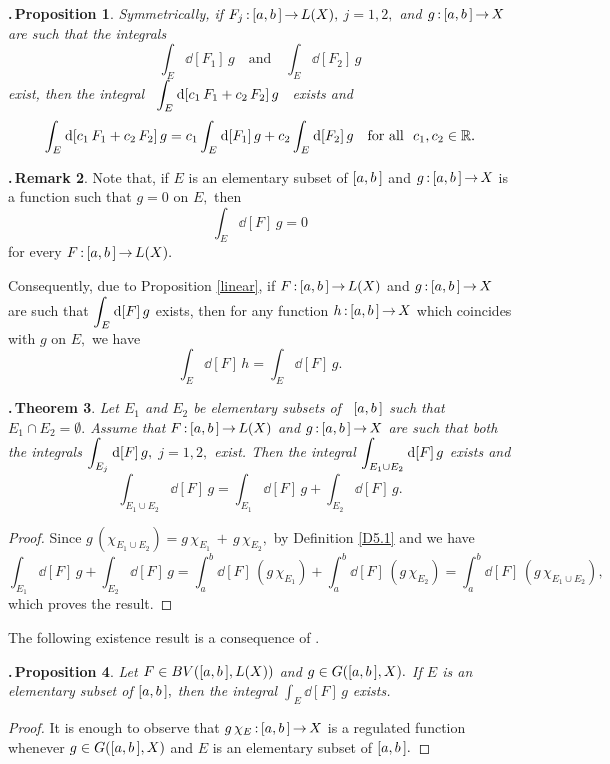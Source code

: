 \documentclass[12pt,twoside]{article}
\numberwithin{equation}{section}
\theoremstyle{plain}
\newtheorem{theorem}{\hskip-1mm.\,Theorem}[section]
\newtheorem{proposition}[theorem]{\hskip-1mm.\,Proposition}
\theoremstyle{definition}
\newtheorem{remark}[theorem]{\hskip-1mm.\,Remark}
\begin{document}
{\begin{proposition}
Symmetrically, if $F_j\,{:}\,[a,b\,]\,{\to}\,L(X),$ $j=1,2,$ and $g\,{:}\,[a,b\,]\,{\to}\,X$
are such that the integrals
\[
    \int_E\dd[F_1]\,g \quad\mbox{and}\quad \int_E\dd[F_2]\,g
\]
exist, then the integral \ $\displaystyle\int_E\hskip0.2mm\mbox{\rm d}[c_1\,F_1+c_2\,F_2]\,g$ \ exists and
\[
  \int_E\hskip0.2mm\mbox{\rm d}[c_1\,F_1+c_2\,F_2]\,g=c_1\int_E\hskip0.2mm\mbox{\rm d}[F_1]\,g+c_2\int_E\hskip0.2mm\mbox{\rm d}[F_2]\,g
  \quad\mbox{for all \ } c_1,c_2\in{\mathbb R}.
\]
\end{proposition}

\smallskip

\begin{remark}
Note that, if $E$ is an elementary subset of $[a,b\,]$ and $g\,{:}\,[a,b\,]\,{\to}\,X$
is a function such that $g=0$ on $E,$ then
\[
   \int_{E}\dd[F]\,g=0
\]
for every $F\,{:}\,[a,b\,]\,{\to}\,L(X).$

Consequently, due to Proposition \ref{linear}, if $F\,{:}\,[a,b\,]\,{\to}\,L(X)$ and
$g\,{:}\,[a,b\,]\,{\to}\,X$ are such that $\displaystyle\int_{E}\hskip0.2mm\mbox{\rm d}[F]\,g$ exists, then for any
function $h\,{:}\,[a,b\,]\,{\to}\,X$ which coincides with $g$ on $E,$ we have
\[
   \int_{E}\dd[F]\,h=\int_{E}\dd[F]\,g.
\]
\end{remark}

\smallskip

\begin{theorem}\label{add}
Let $E_{1}$ and $E_{2}$ be elementary subsets of \ $[a,b\,]$ such that
$E_{1}\cap E_{2}=\emptyset.$ Assume that $F\,{:}\,[a,b\,]\,{\to}\,L(X)$ and
$g\,{:}\,[a,b\,]\,{\to}\,X$ are such that both the integrals
$\displaystyle\int_{E_{j}}\hskip0.2mm\mbox{\rm d}[F]\,g,$ $j=1,2,$ exist. Then the integral
$\displaystyle\int_{E_1\cup E_2}\hskip0.2mm\mbox{\rm d}[F]\,g$ exists and
\[
   \int_{E_1\cup E_2}\dd[F]\,g=\int_{E_{1}}\dd[F]\,g+\int_{E_{2}}\dd[F]\,g.
\]
\end{theorem}
\begin{proof}
Since $g\,(\chi_{E_{1}\cup E_{2}})=g\,\chi_{E_1}\,{+}\,g\,\chi_{E_{2}},$
by Definition \ref{D5.1} and \cite[Proposition 6]{Sch1} we have
\[
  \int_{E_{1}}\dd[F]\,g+\int_{E_{2}}\dd[F]\,g
  =\int_a^b\dd[F]\,(g\,\chi_{E_1})
   +\int_a^b\dd[F]\,(g\,\chi_{E_{2}})=\int_a^b\dd[F]\,(g\,\chi_{E_1\cup E_2}),
\]
which proves the result.
\end{proof}

\smallskip

The following existence result is a consequence of \cite[Proposition 15]{Sch1}.

\begin{proposition}\label{existence}
Let $F\in BV([a,b\,],L(X))$ and $g\in G([a,b\,],X).$ If $E$ is an elementary subset
of $[a,b\,],$ then the integral $\int_E\dd[F]\,g$ exists.
\end{proposition}
\begin{proof} It is enough to observe that $g\,\chi_E\,{:}\,[a,b\,]\,{\to}\,X$ is
a regulated function whenever $g\in G([a,b\,],X)$ and $E$ is an elementary subset
of $[a,b\,].$
\end{proof}

}
\end{document}
